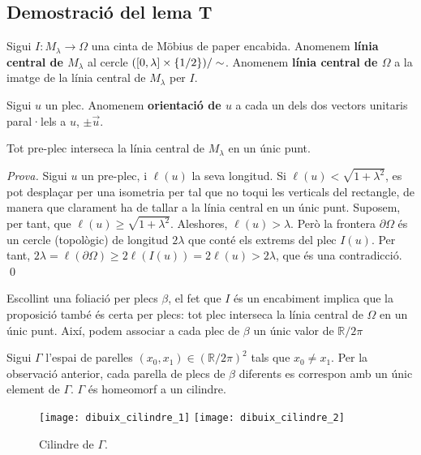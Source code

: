 \subsection{Demostració del lema T}
\begin{defi}
    Sigui $I:M_\lambda\to\Omega$ una cinta de Möbius de paper encabida. 
    Anomenem \textbf{línia central de $M_\lambda$} al cercle $([0,\lambda]\times\{1/2\})/\sim$.
    Anomenem \textbf{línia central de $\Omega$} a la imatge de la línia central de $M_\lambda$ per $I$.
\end{defi}

\begin{defi}
    Sigui $u$ un plec. Anomenem \textbf{orientació de $u$} a cada un dels dos vectors unitaris paral·lels a $u$, $\pm \vec u$.
\end{defi}

\begin{prop}
    Tot pre-plec interseca la línia central de $M_\lambda$ en un únic punt.
\end{prop}
{
    \color{green!50!black}
    \textit{Prova.}
    Sigui $u$ un pre-plec, i $\ell(u)$ la seva longitud. Si $\ell(u)<\sqrt{1+\lambda^2}$, es pot desplaçar per una isometria per tal que no toqui les verticals del rectangle, de manera que clarament ha de tallar a la línia central en un únic punt.
    Suposem, per tant, que $\ell(u)\geq\sqrt{1+\lambda^2}$. Aleshores, $\ell(u)>\lambda$. Però la frontera $\partial \Omega$ és un cercle (topològic) de longitud $2\lambda$ que conté els extrems del plec $I(u)$. Per tant, $2\lambda = \ell(\partial \Omega) \ge  2\ell(I(u)) = 2\ell(u)>2\lambda$, que és una contradicció.
    \qed
}
\begin{obs}
    Escollint una foliació per plecs $\beta$, el fet que $I$ és un encabiment implica que la proposició també és certa per plecs: tot plec interseca la línia central de $\Omega$ en un únic punt. Així, podem associar a cada plec de $\beta$ un únic valor de $\mathbb R/2\pi$
\end{obs}

Sigui $\Gamma$ l'espai de parelles $(x_0,x_1)\in(\mathbb R/2\pi)^2$ tals que $x_0\neq x_1$. Per la observació anterior, cada parella de plecs de $\beta$ diferents es correspon amb un únic element de $\Gamma$. $\Gamma$ és homeomorf a un cilindre.

\begin{figure}[htbp]
    \centering
    \texttt{[image: dibuix\_cilindre\_1]}
    \raisebox{5\height}{$\quad\quad\Large\cong\quad$}
    \texttt{[image: dibuix\_cilindre\_2]}
    \caption{Cilindre de $\Gamma$.}
    \label{fig:cilindre}
\end{figure}

